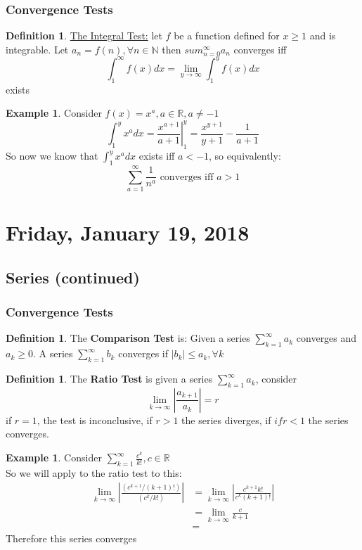 \documentclass[12pt]{article}
\theoremstyle{plain}
\theoremstyle{definition}
\newtheorem{definition}[theorem]{Definition}
\newtheorem{example}[theorem]{Example}
\begin{document}
\subsubsection{Convergence Tests}

\begin{definition}
	\underline{The Integral Test:} let $f$ be a function defined for $x \geq 1$ and is integrable. Let $a_n = f(n), \forall n \in\mathbb{N}$ then $sum^\infty_{n=0} a_n$ converges iff
$$\int^\infty_1 f(x) dx = \lim_{y\to\infty} \int^y_1 f(x) dx$$ exists
\end{definition}

\begin{example}
	Consider $f(x)=x^a, a\in\mathbb{R}, a\neq -1$
	$$\int^y_1 x^a dx = \left.\frac{x^{a+1}}{a+1}\right|^y_1 = \frac{x^{y+1}}{y+1} - \frac{1}{a+1}$$
	So now we know that $\int^y_1 x^a dx$ exists iff $a < -1$, so equivalently:
	$$\sum^\infty_{a=1} \frac{1}{n^a} \text{ converges iff } a > 1$$
\end{example}

\newpage

\section{Friday, January 19, 2018}

\subsection{Series (continued)}

\subsubsection{Convergence Tests}

\begin{definition}
	The \textbf{Comparison Test} is: Given a series $\sum^\infty_{k=1} a_k$ converges and $a_k \geq 0$. A series $\sum^\infty_{k=1} b_k$ converges if $|b_k| \leq a_k, \forall k$ 
\end{definition}

\begin{definition}
	The \textbf{Ratio Test} is given a series $\sum^\infty_{k=1} a_k$, consider
	$$\lim_{k\to\infty} |\frac{a_{k+1}}{a_k}| = r$$
	if $r=1$, the test is inconclusive, if $r > 1$ the series diverges, if $if r < 1 $ the series converges.
\end{definition}

\begin{example}
	Consider $\sum^\infty_{k=1} \frac{c^k}{k!}, c\in\mathbb{R}$\\
	So we will apply to the ratio test to this:
	\begin{align*}
		\lim_{k\to\infty} |\frac{(c^{k+1}/(k+1)!)}{(c^k/k!)}| &= \lim_{k\to\infty} |\frac{c^{k+1}k!}{c^k (k+1)!}|\\
		&= \lim_{k\to\infty} \frac{c}{k+1}\\
		&=
	\end{align*}
	Therefore this series converges
\end{example}
\end{document}

